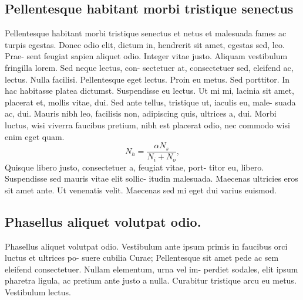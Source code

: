 \documentclass[preprint,3p,times,twocolumn]{elsarticle}  %
\begin{document}
\subsection{Pellentesque habitant morbi tristique senectus}\label{subsec:sf5}%
Pellentesque habitant morbi tristique senectus et netus et malesuada fames 
ac turpis egestas. Donec odio elit, dictum in, hendrerit sit amet, egestas 
sed, leo. Prae- sent feugiat sapien aliquet odio. Integer vitae justo. Aliquam 
vestibulum fringilla lorem. Sed neque lectus, con- sectetuer at, consectetuer 
sed, eleifend ac, lectus. Nulla facilisi. Pellentesque eget lectus. Proin 
eu metus. Sed porttitor. In hac habitasse platea dictumst. Suspendisse eu 
lectus. Ut mi mi, lacinia sit amet, placerat et, mollis vitae, dui. Sed 
ante tellus, tristique ut, iaculis eu, male- suada ac, dui. Mauris nibh 
leo, facilisis non, adipiscing quis, ultrices a, dui.  Morbi luctus, wisi 
viverra faucibus pretium, nibh est placerat odio, nec commodo wisi enim 
eget quam.  
\begin{equation}\label{eq:1}
           N_h    =       \frac{\alpha N_s}
                            {N_i+ N_o},
\end{equation}
Quisque libero justo, consectetuer a, feugiat vitae, port- titor 
eu, libero. Suspendisse sed mauris vitae elit sollic- itudin malesuada. 
Maecenas ultricies eros sit amet ante.  Ut venenatis velit. Maecenas sed 
mi eget dui varius euismod. 


%
%

\subsection{Phasellus aliquet volutpat odio.}\label{subsec:sf6}%
Phasellus aliquet volutpat odio. Vestibulum 
ante ipsum primis in faucibus orci luctus et ultrices po- suere cubilia 
Curae; Pellentesque sit amet pede ac sem eleifend consectetuer. Nullam elementum,
 urna vel im- perdiet sodales, elit ipsum pharetra ligula, ac pretium ante 
justo a nulla. Curabitur tristique arcu eu metus.  Vestibulum lectus. 
\end{document}
